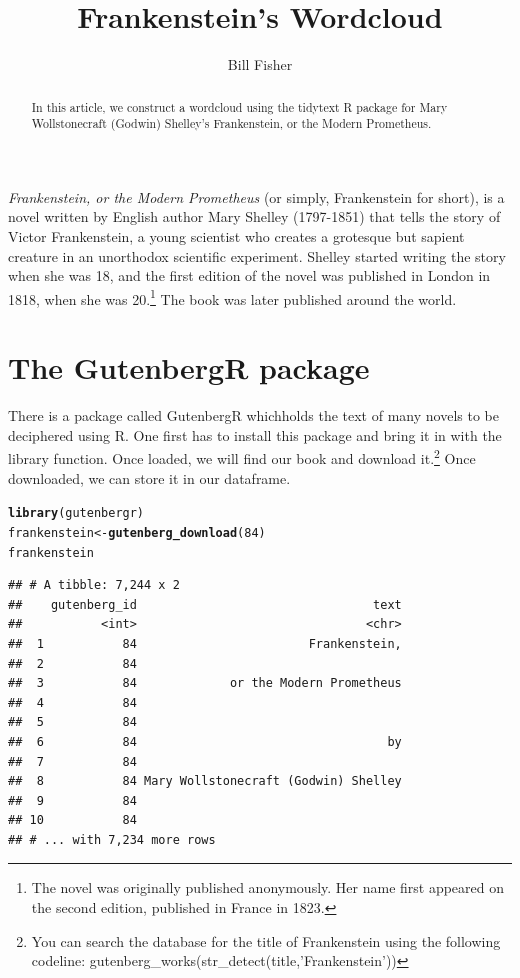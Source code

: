 \documentclass{article}\usepackage[]{graphicx}\usepackage[]{color}
\makeatletter
\newcommand{\hlnum}[1]{\textcolor[rgb]{0.686,0.059,0.569}{#1}}%
\newcommand{\hlstd}[1]{\textcolor[rgb]{0.345,0.345,0.345}{#1}}%
\newcommand{\hlkwb}[1]{\textcolor[rgb]{0.69,0.353,0.396}{#1}}%
\newcommand{\hlkwd}[1]{\textcolor[rgb]{0.737,0.353,0.396}{\textbf{#1}}}%
\newenvironment{kframe}{%
 \def\at@end@of@kframe{}%
 \ifinner\ifhmode%
  \def\at@end@of@kframe{\end{minipage}}%
  \begin{minipage}{\columnwidth}%
 \fi\fi%
 \def\FrameCommand##1{\hskip\@totalleftmargin \hskip-\fboxsep
 \colorbox{shadecolor}{##1}\hskip-\fboxsep
     \hskip-\linewidth \hskip-\@totalleftmargin \hskip\columnwidth}%
 \MakeFramed {\advance\hsize-\width
   \@totalleftmargin\z@ \linewidth\hsize
   \@setminipage}}%
 {\par\unskip\endMakeFramed%
 \at@end@of@kframe}
\newenvironment{knitrout}{}{} %
\makeatother
\begin{document}
\title{Frankenstein's Wordcloud}
\author{Bill Fisher}
\maketitle

\begin{abstract}
In this article, we construct a wordcloud using the tidytext R package for Mary Wollstonecraft (Godwin) Shelley's Frankenstein, or the Modern Prometheus.
\end{abstract}

\textit{Frankenstein, or the Modern Prometheus} (or simply, Frankenstein for short), is a novel written by English author Mary Shelley (1797-1851) that tells the story of Victor Frankenstein, a young scientist who creates a grotesque but sapient creature in an unorthodox scientific experiment. Shelley started writing the story when she was 18, and the first edition of the novel was published in London in 1818, when she was 20.\footnote{The novel was originally published anonymously. Her name first appeared on the second edition, published in France in 1823.}  The book was later published around the world.\citep{Wikipedia}

\section{The GutenbergR package}
There is a package called GutenbergR whichholds the text of many novels to be deciphered using R.  One first has to install this package and bring it in with the library function.  Once loaded, we will find our book and download it.\footnote{You can search the database for the title of Frankenstein using the following codeline: gutenberg\_works(str\_detect(title,'Frankenstein'))} Once downloaded, we can store it in our dataframe.

\begin{knitrout}
\color{fgcolor}\begin{kframe}
\begin{alltt}
\hlkwd{library}\hlstd{(gutenbergr)}
\hlstd{frankenstein}\hlkwb{<-}\hlkwd{gutenberg_download}\hlstd{(}\hlnum{84}\hlstd{)}
\hlstd{frankenstein}
\end{alltt}
\begin{verbatim}
## # A tibble: 7,244 x 2
##    gutenberg_id                                 text
##           <int>                                <chr>
##  1           84                        Frankenstein,
##  2           84                                     
##  3           84             or the Modern Prometheus
##  4           84                                     
##  5           84                                     
##  6           84                                   by
##  7           84                                     
##  8           84 Mary Wollstonecraft (Godwin) Shelley
##  9           84                                     
## 10           84                                     
## # ... with 7,234 more rows
\end{verbatim}
\end{kframe}
\end{knitrout}
\end{document}
